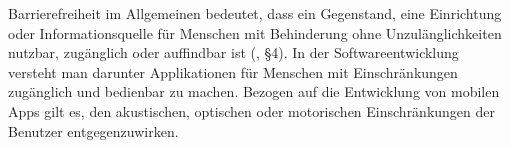 
Barrierefreiheit im Allgemeinen bedeutet, dass ein Gegenstand, eine Einrichtung oder Informationsquelle für Menschen mit Behinderung ohne Unzulänglichkeiten nutzbar, zugänglich oder auffindbar ist (\cite{behindertengleichstellungsgesetz}, §4). In der Softwareentwicklung versteht man darunter Applikationen für Menschen mit Einschränkungen zugänglich und bedienbar zu machen. Bezogen auf die Entwicklung von  mobilen Apps gilt es, den akustischen, optischen oder motorischen Einschränkungen der Benutzer entgegenzuwirken. \\

